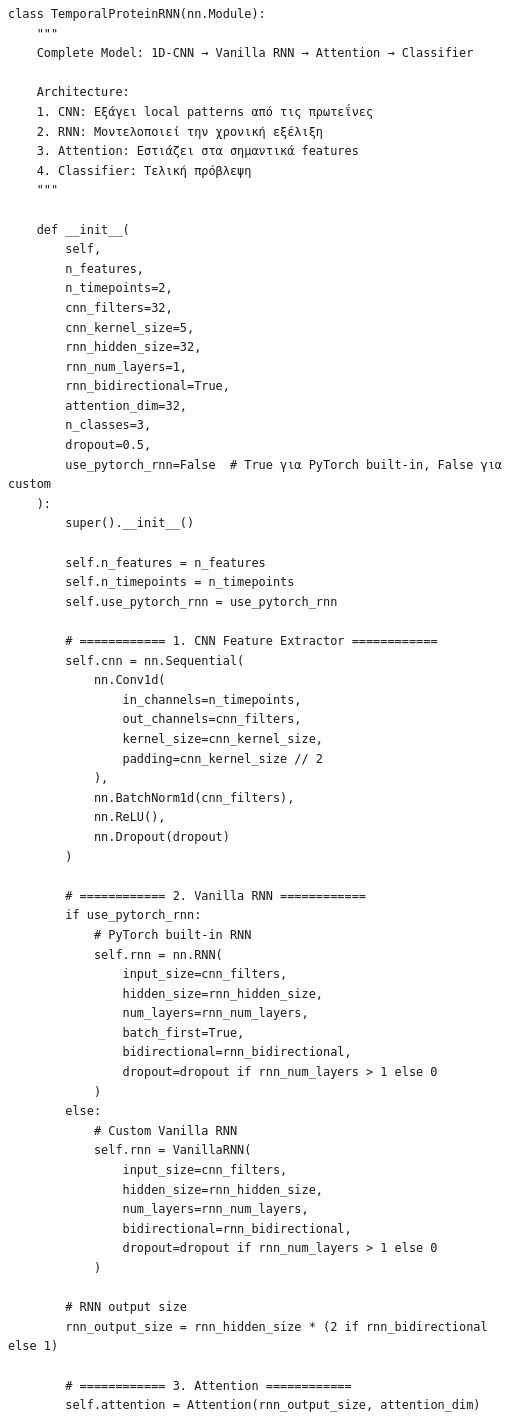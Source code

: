 \begin{lstlisting}
class TemporalProteinRNN(nn.Module):
    """
    Complete Model: 1D-CNN → Vanilla RNN → Attention → Classifier
 
    Architecture:
    1. CNN: Εξάγει local patterns από τις πρωτεΐνες
    2. RNN: Μοντελοποιεί την χρονική εξέλιξη
    3. Attention: Εστιάζει στα σημαντικά features
    4. Classifier: Τελική πρόβλεψη
    """
 
    def __init__(
        self,
        n_features,
        n_timepoints=2,
        cnn_filters=32,
        cnn_kernel_size=5,
        rnn_hidden_size=32,
        rnn_num_layers=1,
        rnn_bidirectional=True,
        attention_dim=32,
        n_classes=3,
        dropout=0.5,
        use_pytorch_rnn=False  # True για PyTorch built-in, False για custom
    ):
        super().__init__()
 
        self.n_features = n_features
        self.n_timepoints = n_timepoints
        self.use_pytorch_rnn = use_pytorch_rnn
 
        # ============ 1. CNN Feature Extractor ============
        self.cnn = nn.Sequential(
            nn.Conv1d(
                in_channels=n_timepoints,
                out_channels=cnn_filters,
                kernel_size=cnn_kernel_size,
                padding=cnn_kernel_size // 2
            ),
            nn.BatchNorm1d(cnn_filters),
            nn.ReLU(),
            nn.Dropout(dropout)
        )
 
        # ============ 2. Vanilla RNN ============
        if use_pytorch_rnn:
            # PyTorch built-in RNN
            self.rnn = nn.RNN(
                input_size=cnn_filters,
                hidden_size=rnn_hidden_size,
                num_layers=rnn_num_layers,
                batch_first=True,
                bidirectional=rnn_bidirectional,
                dropout=dropout if rnn_num_layers > 1 else 0
            )
        else:
            # Custom Vanilla RNN
            self.rnn = VanillaRNN(
                input_size=cnn_filters,
                hidden_size=rnn_hidden_size,
                num_layers=rnn_num_layers,
                bidirectional=rnn_bidirectional,
                dropout=dropout if rnn_num_layers > 1 else 0
            )
 
        # RNN output size
        rnn_output_size = rnn_hidden_size * (2 if rnn_bidirectional else 1)
 
        # ============ 3. Attention ============
        self.attention = Attention(rnn_output_size, attention_dim)
 

\end{lstlisting}
